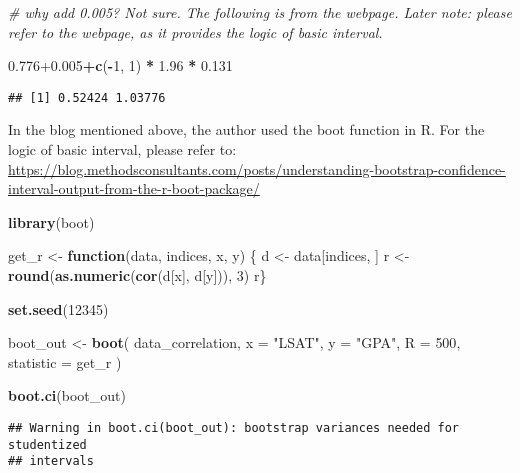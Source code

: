 \documentclass[]{book}
\newenvironment{Shaded}{\begin{snugshade}}{\end{snugshade}}
\newcommand{\CommentTok}[1]{\textcolor[rgb]{0.56,0.35,0.01}{\textit{#1}}}
\newcommand{\ControlFlowTok}[1]{\textcolor[rgb]{0.13,0.29,0.53}{\textbf{#1}}}
\newcommand{\DataTypeTok}[1]{\textcolor[rgb]{0.13,0.29,0.53}{#1}}
\newcommand{\DecValTok}[1]{\textcolor[rgb]{0.00,0.00,0.81}{#1}}
\newcommand{\FloatTok}[1]{\textcolor[rgb]{0.00,0.00,0.81}{#1}}
\newcommand{\KeywordTok}[1]{\textcolor[rgb]{0.13,0.29,0.53}{\textbf{#1}}}
\newcommand{\NormalTok}[1]{#1}
\newcommand{\OperatorTok}[1]{\textcolor[rgb]{0.81,0.36,0.00}{\textbf{#1}}}
\newcommand{\StringTok}[1]{\textcolor[rgb]{0.31,0.60,0.02}{#1}}
\begin{document}
\begin{Shaded}
\begin{Highlighting}[]
\CommentTok{# why add 0.005? Not sure. The following is from the webpage. Later note: please refer to the webpage, as it provides the logic of basic interval.}

\FloatTok{0.776+0.005}\OperatorTok{+}\KeywordTok{c}\NormalTok{(}\OperatorTok{-}\DecValTok{1}\NormalTok{, }\DecValTok{1}\NormalTok{) }\OperatorTok{*}\StringTok{ }\FloatTok{1.96} \OperatorTok{*}\StringTok{ }\FloatTok{0.131}
\end{Highlighting}
\end{Shaded}

\begin{verbatim}
## [1] 0.52424 1.03776
\end{verbatim}

In the blog mentioned above, the author used the boot function in R. For the logic of basic interval, please refer to:
\url{https://blog.methodsconsultants.com/posts/understanding-bootstrap-confidence-interval-output-from-the-r-boot-package/}

\begin{Shaded}
\begin{Highlighting}[]
\KeywordTok{library}\NormalTok{(boot)}

\NormalTok{get_r <-}\StringTok{ }\ControlFlowTok{function}\NormalTok{(data, indices, x, y) \{}
\NormalTok{  d <-}\StringTok{ }\NormalTok{data[indices, ]}
\NormalTok{  r <-}\StringTok{ }\KeywordTok{round}\NormalTok{(}\KeywordTok{as.numeric}\NormalTok{(}\KeywordTok{cor}\NormalTok{(d[x], d[y])), }\DecValTok{3}\NormalTok{)}
\NormalTok{  r\}}

\KeywordTok{set.seed}\NormalTok{(}\DecValTok{12345}\NormalTok{)}

\NormalTok{boot_out <-}\StringTok{ }\KeywordTok{boot}\NormalTok{(}
\NormalTok{  data_correlation,}
  \DataTypeTok{x =} \StringTok{"LSAT"}\NormalTok{, }
  \DataTypeTok{y =} \StringTok{"GPA"}\NormalTok{, }
  \DataTypeTok{R =} \DecValTok{500}\NormalTok{,}
  \DataTypeTok{statistic =}\NormalTok{ get_r}
\NormalTok{)}

\KeywordTok{boot.ci}\NormalTok{(boot_out)}
\end{Highlighting}
\end{Shaded}

\begin{verbatim}
## Warning in boot.ci(boot_out): bootstrap variances needed for studentized
## intervals
\end{verbatim}
\end{document}
